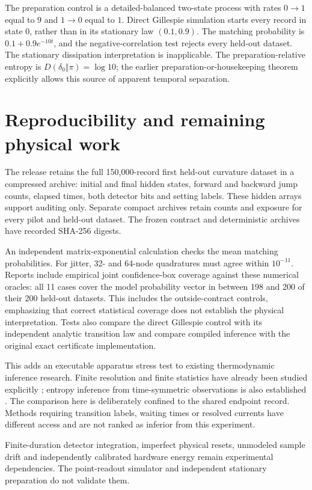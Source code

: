 The preparation control is a detailed-balanced two-state process with
rates $0\to1$ equal to $9$ and $1\to0$ equal to $1$. Direct Gillespie
simulation starts every record in state $0$, rather than in its stationary
law $(0.1,0.9)$. The matching probability is
$0.1+0.9e^{-10t}$, and the negative-correlation test rejects every held-out
dataset. The stationary dissipation interpretation is inapplicable.
The preparation-relative entropy is $D(\delta_0\Vert\pi)=\log10$;
the earlier preparation-or-housekeeping theorem explicitly allows this
source of apparent temporal separation.

\section{Reproducibility and remaining physical work}

The release retains the full 150,000-record first held-out curvature dataset
in a compressed archive: initial and final hidden states, forward and
backward jump counts, elapsed times, both detector bits and setting labels.
These hidden arrays support auditing only. Separate compact archives retain
counts and exposure for every pilot and held-out dataset. The frozen
contract and deterministic archives have recorded SHA-256 digests.

An independent matrix-exponential calculation checks the mean matching
probabilities. For jitter, 32- and 64-node quadratures must agree within
$10^{-11}$. Reports include empirical joint confidence-box coverage against
these numerical oracles: all 11 cases cover the model probability vector
in between 198 and 200 of their 200 held-out datasets. This includes the
outside-contract controls, emphasizing that correct statistical coverage
does not establish the physical interpretation. Tests also compare the direct Gillespie control
with its independent analytic transition law and compare compiled inference
with the original exact certificate implementation.

This adds an executable apparatus stress test to existing thermodynamic
inference research. Finite resolution and finite statistics have already
been studied explicitly \cite{vlFritz2025}; entropy inference from
time-symmetric observations is also established \cite{vlSkinner2021}.
The comparison here is deliberately confined to the shared endpoint record.
Methods requiring transition labels, waiting times or resolved currents
have different access and are not ranked as inferior from this experiment.

Finite-duration detector integration, imperfect physical resets,
unmodeled sample drift and independently calibrated hardware energy remain
experimental dependencies. The point-readout simulator and independent
stationary preparation do not validate them.
